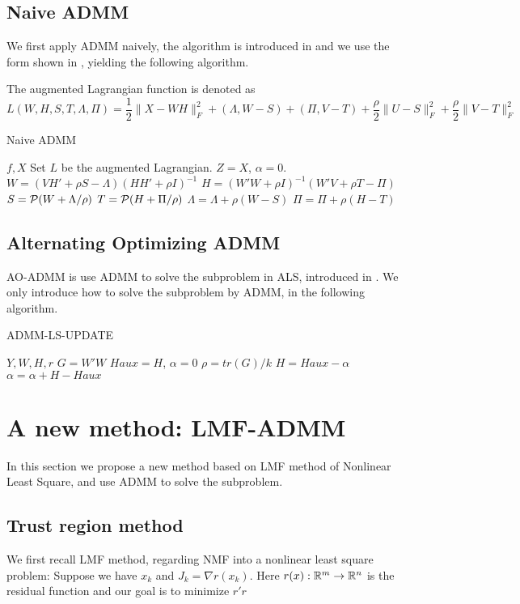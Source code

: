 \documentclass{article}
\renewcommand{\grad}{\nabla}
\begin{document}
\subsection{Naive ADMM}
We first apply ADMM naively, the algorithm is introduced in \cite{CITE} and we use the form shown in \cite{rk1admm}, yielding the following algorithm.

The augmented Lagrangian function is denoted as 
$$L(W,H,S,T,\Lambda, \Pi) = \frac{1}{2} \|X - WH\|_F^2 +  (\Lambda, W-S) + (\Pi, V-T) + \frac{\rho}{2}\|U-S\|_F^2 + \frac{\rho}{2} \|V-T\|_F^2$$

\begin{algorithm}
	\caption{Naive ADMM}
	\begin{algorithmic}[1]
		\REQUIRE $f, X$
		\STATE Set $L$ be the augmented Lagrangian.
		\STATE $Z = X$, $\alpha = 0$.
    \STATE $W = (VH'+\rho S-\Lambda)(HH'+\rho I)^{-1}$
\STATE $H = (W'W+\rho I)^{-1}(W'V+\rho T-\Pi)$
\STATE $S = \P(W + \Lambda/\rho)$
\STATE $T = \P(H + \Pi/\rho)$
\STATE $\Lambda = \Lambda + \rho(W-S)$
\STATE $\Pi = \Pi + \rho(H-T)$
		\ENDWHILE
	\end{algorithmic}
\end{algorithm}

\subsection{Alternating Optimizing ADMM}
AO-ADMM is use ADMM to solve the subproblem in ALS, introduced in \cite{aoadmm}. We only introduce how to solve the subproblem by ADMM, in the following algorithm.

\begin{algorithm}[H]
	\caption{ADMM-LS-UPDATE}
	\begin{algorithmic}[1]
		\REQUIRE $Y,W,H,r$
		\STATE $G = W'W$
		\STATE $Haux = H$, $\alpha = 0$
		\STATE $\rho = tr(G)/k$
		\STATE $H= Haux - \alpha$
		\STATE $\alpha = \alpha + H - Haux$
		\ENDFOR
	\end{algorithmic}
\end{algorithm}

\section{A new method: LMF-ADMM}
In this section we propose a new method based on LMF method of Nonlinear Least Square, and use ADMM to solve the subproblem.
\subsection{Trust region method}
We first recall LMF method, regarding NMF into a nonlinear least square problem: 
Suppose we have $x_k$ and $J_k = \grad r(x_k)$. Here $r(x) : \R^m \to \R^n$ is the residual function and our goal is to minimize $r'r$
\end{document}
